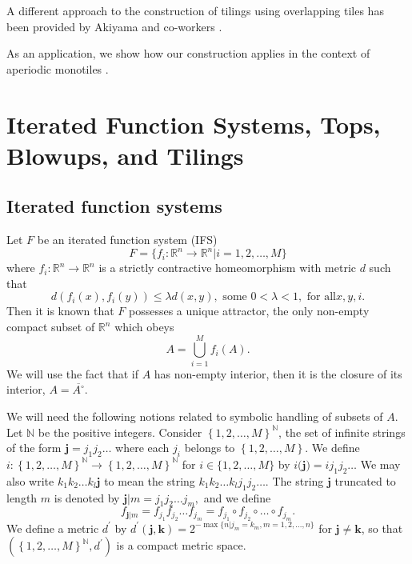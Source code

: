 \documentclass{amsproc}%
\theoremstyle{plain}
\theoremstyle{definition}
\numberwithin{equation}{section}
\begin{document}
A different approach to the construction of tilings using overlapping tiles
has been provided by Akiyama and co-workers \cite{akiyama2}.

As an application, we show how our construction applies in the context of
aperiodic monotiles \cite{smith}.

\section{Iterated Function Systems, Tops, Blowups, and Tilings}

\subsection{Iterated function systems}

Let $F$ be an iterated function system (IFS)
\[
F=\{f_{i}:\mathbb{R}^{n}\mathbb{\rightarrow R}^{n}|i=1,2,\dots,M\}
\]
where $f_{i}:\mathbb{R}^{n}\mathbb{\rightarrow R}^{n}$ is a strictly
contractive homeomorphism with metric $d$ such that
\[
d(f_{i}(x),f_{i}(y))\leq\lambda d(x,y),\text{ some }0<\lambda<1,\text{ for all
}x,y,i.
\]
Then it is known \cite{hutchinson} that $F$ possesses a unique attractor, the
only non-empty compact subset of $\mathbb{R}^{n}$ which obeys
\[
A=\bigcup\limits_{i=1}^{M}f_{i}(A).
\]
We will use the fact that if $A$ has non-empty interior, then it is the
closure of its interior, $A=\overline{A^{\circ}}.$

We will need the following notions related to symbolic handling of subsets of
$A.$ Let $\mathbb{N}$ be the positive integers. Consider $\left\{
1,2,\dots,M\right\}  ^{\mathbb{N}}$, the set of infinite strings of the form
$\mathbf{j}=j_{1}j_{2}\dots$ where each $j_{i}$ belongs to $\left\{
1,2,\dots,M\right\}  $. We define $i:\left\{  1,2,\dots,M\right\}
^{\mathbb{N}}\rightarrow\left\{  1,2,\dots,M\right\}  ^{\mathbb{N}}$ for
$i\in\{1,2,\dots,M\}$ by $i(\mathbf{j)=}ij_{1}j_{2}\dots$ We may also write
$k_{1}k_{2}\dots k_{l}\mathbf{j}$ to mean the string $k_{1}k_{2}\dots
k_{l}j_{1}j_{2}\dots.$ The string $\mathbf{j}$ truncated to length $m$ is
denoted by $\mathbf{j}|m=j_{1}j_{2}\dots j_{m},$ and we define
\[
f_{\mathbf{j}|m}=f_{j_{1}}f_{j_{2}}\dots f_{j_{m}}=f_{j_{1}}\circ f_{j_{2}%
}\circ\dots\circ f_{j_{m}}.
\]
We define a metric $d^{\prime}$ by $d^{\prime}(\mathbf{j},\mathbf{k}%
)=2^{-\max\{n|j_{m}=k_{m},m=1,2,...,n\}}$ for $\mathbf{j}\neq\mathbf{k}$, so
that $\left(  \left\{  1,2,\dots,M\right\}  ^{\mathbb{N}},d^{\prime}\right)  $
is a compact metric space.
\end{document}
